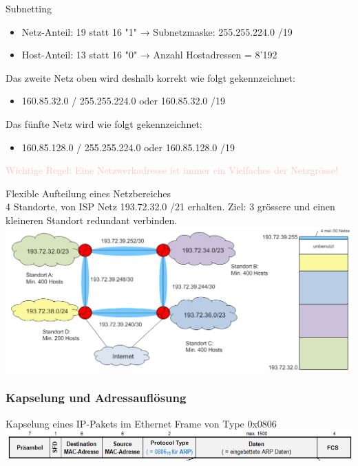 \begin{concept}{Subnetting}
    \begin{itemize}
        \item Netz-Anteil: 19 statt 16 "1" → Subnetzmaske: 255.255.224.0 /19
        \item Host-Anteil: 13 statt 16 "0" → Anzahl Hostadressen = 8'192
    \end{itemize}
    Das zweite Netz oben wird deshalb korrekt wie folgt gekennzeichnet:
    \begin{itemize}
        \item 160.85.32.0 / 255.255.224.0 oder 160.85.32.0 /19
    \end{itemize}
    Das fünfte Netz wird wie folgt gekennzeichnet:
    \begin{itemize}
        \item 160.85.128.0 / 255.255.224.0 oder 160.85.128.0 /19
    \end{itemize}
    \textcolor{pink}{Wichtige Regel: Eine Netzwerkadresse ist immer ein Vielfaches der Netzgrösse!}
\end{concept}

\begin{example2}{Flexible Aufteilung eines Netzbereiches}\\
    4 Standorte, von ISP Netz 193.72.32.0 /21 erhalten. Ziel: 3 grössere und einen kleineren Standort redundant verbinden.\\
        \includegraphics[width=1\linewidth]{images/flexible_aufteilung_netzbereich.png}    
\end{example2}





\columnbreak

\subsubsection{Kapselung und Adressauflösung}

\begin{definition}{Kapselung eines IP-Pakets im Ethernet Frame} von Type 0x0806\\
        \includegraphics[width=1\linewidth]{images/kapselung_ip_paket.png}
\end{definition}



